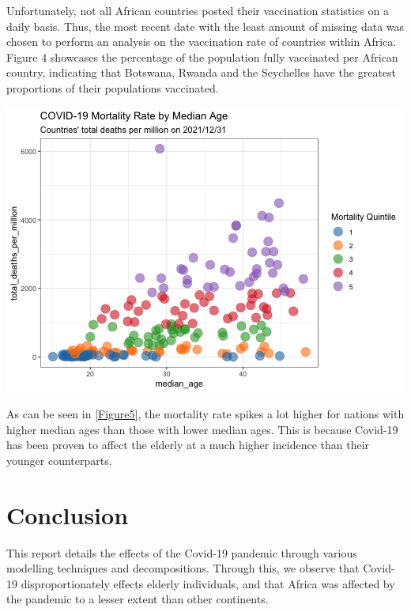 \documentclass[11pt,preprint, authoryear]{elsarticle}
\let\origfigure\figure
\let\endorigfigure\endfigure
\renewenvironment{figure}[1][2] {
    \expandafter\origfigure\expandafter[H]
} {
    \endorigfigure
}
\numberwithin{equation}{section}
\numberwithin{figure}{section}
\numberwithin{table}{section}
\begin{document}
Unfortunately, not all African countries posted their vaccination
statistics on a daily basis. Thus, the most recent date with the least
amount of missing data was chosen to perform an analysis on the
vaccination rate of countries within Africa. Figure 4 showcases the
percentage of the population fully vaccinated per African country,
indicating that Botswana, Rwanda and the Seychelles have the greatest
proportions of their populations vaccinated.

\begin{figure}[H]

{\centering \includegraphics{q1_files/figure-latex/Figure5-1} 

}

\caption{Mortality Rate of Countries by Median Age \label{Figure5}}\label{fig:Figure5}
\end{figure}

As can be seen in \ref{Figure5}, the mortality rate spikes a lot higher
for nations with higher median ages than those with lower median ages.
This is because Covid-19 has been proven to affect the elderly at a much
higher incidence than their younger counterparts.

\hypertarget{conclusion}{%
\section{\texorpdfstring{Conclusion
\label{Conclusion}}{Conclusion }}\label{conclusion}}

This report details the effects of the Covid-19 pandemic through various
modelling techniques and decompositions. Through this, we observe that
Covid-19 disproportionately effects elderly individuals, and that Africa
was affected by the pandemic to a lesser extent than other continents.


\end{document}
